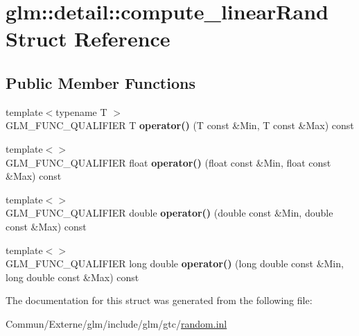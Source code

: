 \hypertarget{structglm_1_1detail_1_1compute__linear_rand}{}\section{glm\+:\+:detail\+:\+:compute\+\_\+linear\+Rand Struct Reference}
\label{structglm_1_1detail_1_1compute__linear_rand}
\subsection*{Public Member Functions}
\begin{DoxyCompactItemize}
\item 
{\footnotesize template$<$typename T $>$ }\\G\+L\+M\+\_\+\+F\+U\+N\+C\+\_\+\+Q\+U\+A\+L\+I\+F\+I\+ER T {\bfseries operator()} (T const \&Min, T const \&Max) const \hypertarget{structglm_1_1detail_1_1compute__linear_rand_ac852e16d66ba80ff5309238b3f494b99}{}\label{structglm_1_1detail_1_1compute__linear_rand_ac852e16d66ba80ff5309238b3f494b99}

\item 
{\footnotesize template$<$$>$ }\\G\+L\+M\+\_\+\+F\+U\+N\+C\+\_\+\+Q\+U\+A\+L\+I\+F\+I\+ER float {\bfseries operator()} (float const \&Min, float const \&Max) const \hypertarget{structglm_1_1detail_1_1compute__linear_rand_aeb6d4f603a9afa05544d65233064f2e9}{}\label{structglm_1_1detail_1_1compute__linear_rand_aeb6d4f603a9afa05544d65233064f2e9}

\item 
{\footnotesize template$<$$>$ }\\G\+L\+M\+\_\+\+F\+U\+N\+C\+\_\+\+Q\+U\+A\+L\+I\+F\+I\+ER double {\bfseries operator()} (double const \&Min, double const \&Max) const \hypertarget{structglm_1_1detail_1_1compute__linear_rand_a60dd37b36082f1a8dbfb8d34f0d5575c}{}\label{structglm_1_1detail_1_1compute__linear_rand_a60dd37b36082f1a8dbfb8d34f0d5575c}

\item 
{\footnotesize template$<$$>$ }\\G\+L\+M\+\_\+\+F\+U\+N\+C\+\_\+\+Q\+U\+A\+L\+I\+F\+I\+ER long double {\bfseries operator()} (long double const \&Min, long double const \&Max) const \hypertarget{structglm_1_1detail_1_1compute__linear_rand_ab5433863c50ed60a1ce5ac941759428f}{}\label{structglm_1_1detail_1_1compute__linear_rand_ab5433863c50ed60a1ce5ac941759428f}

\end{DoxyCompactItemize}


The documentation for this struct was generated from the following file\+:\begin{DoxyCompactItemize}
\item 
Commun/\+Externe/glm/include/glm/gtc/\hyperlink{random_8inl}{random.\+inl}\end{DoxyCompactItemize}
